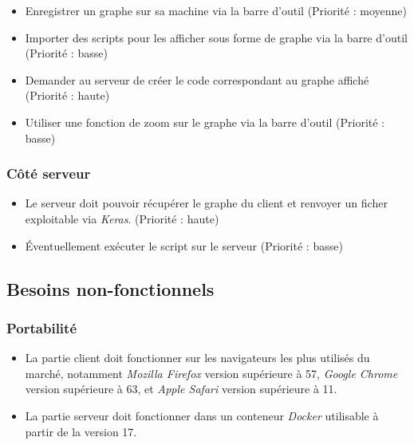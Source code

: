 \documentclass{article}
\begin{document}
\begin{itemize}
    \item Enregistrer un graphe sur sa machine via la barre d'outil (Priorité : moyenne)
    \item Importer des scripts pour les afficher sous forme de graphe via la barre d'outil (Priorité : basse)
    \item Demander au serveur de créer le code correspondant au graphe affiché (Priorité : haute)
    \item Utiliser une fonction de zoom sur le graphe via la barre d'outil (Priorité : basse)
\end{itemize}


\subsubsection{Côté serveur}

\begin{itemize}
    \item Le serveur doit pouvoir récupérer le graphe du client et renvoyer un ficher exploitable via \textit{Keras}. (Priorité : haute)
    \item Éventuellement exécuter le script sur le serveur (Priorité : basse)
\end{itemize}

\subsection{Besoins non-fonctionnels}
\subsubsection{Portabilité}
\begin{itemize}
\item La partie client doit fonctionner sur les navigateurs les plus utilisés du marché, notamment \textit{Mozilla Firefox} version supérieure à 57, \textit{Google Chrome} version supérieure à 63, et \textit{Apple Safari} version supérieure à 11.
\item La partie serveur doit fonctionner dans un conteneur \textit{Docker}\cite{Fink2014} utilisable à partir de la version 17.
\end{itemize}
\end{document}
